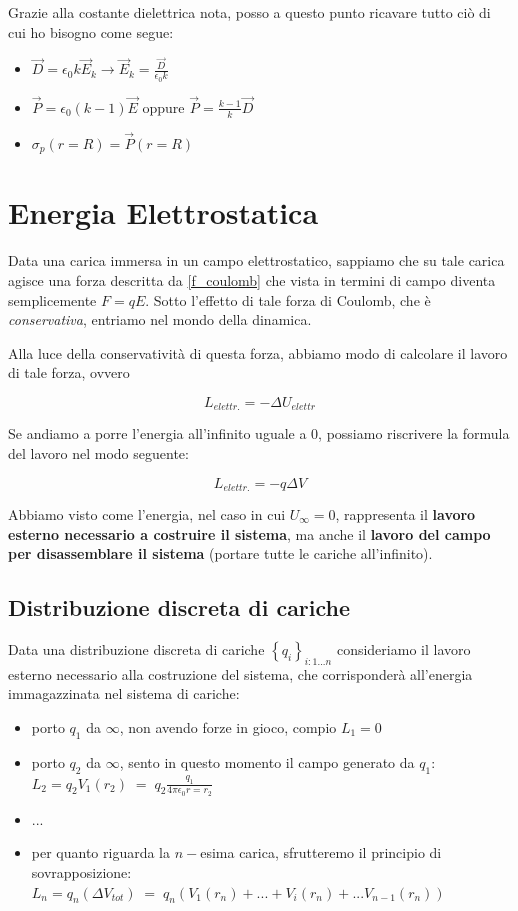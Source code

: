 Grazie alla costante dielettrica nota, posso a questo punto ricavare tutto ciò di cui ho bisogno come segue: 

\begin{itemize}
		\item $ \vec{D} = \epsilon_0 k \vec{E}_k  \longrightarrow \vec{E}_k= \frac{\vec{D}}{\epsilon_0k}$
		\item $\vec{P} = \epsilon_0 (k-1) \vec{E}$ oppure $\vec{P} = \frac{k-1}{k} \vec{D}$
		\item $\sigma_p (r=R) = \vec{P}(r=R)$
\end{itemize}

\section{Energia Elettrostatica}

Data una carica immersa in un campo elettrostatico, sappiamo che su tale carica agisce una forza descritta da \ref{f_coulomb} che vista in termini di campo diventa semplicemente $F = qE$. Sotto l'effetto di tale forza di Coulomb, che è \textit{conservativa}, entriamo nel mondo della dinamica. 

Alla luce della conservatività di questa forza, abbiamo modo di calcolare il lavoro di tale forza, ovvero

$$L_{elettr.} = -\Delta U_{elettr}$$

Se andiamo a porre l'energia all'infinito uguale a 0, possiamo riscrivere la formula del lavoro nel modo seguente: 

$$
L_{elettr.} = -q\Delta V
$$

Abbiamo visto come l'energia, nel caso in cui $U_{\infty} = 0$, rappresenta il \textbf{lavoro esterno necessario a costruire il sistema}, ma anche il \textbf{lavoro del campo per disassemblare il sistema} (portare tutte le cariche all'infinito).

\subsection{Distribuzione discreta di cariche}
Data una distribuzione discreta di cariche $\left\{q_i\right\}_{i:1...n}$ consideriamo il lavoro esterno necessario alla costruzione del sistema, che corrisponderà all'energia immagazzinata nel sistema di cariche: 

\begin{itemize}
	\item  porto $q_1$ da $\infty$, non avendo forze in gioco, compio $L_1 = 0$
	\item  porto $q_2$ da $\infty$, sento in questo momento il campo generato da $q_1$: $L_2 = q_2V_1(r_2) \; = \; q_2\frac{q_1}{4\pi\epsilon_0r=r_2}$
	\item ...
	\item per quanto riguarda la $n-$esima carica, sfrutteremo il principio di sovrapposizione: $L_n = q_n (\Delta V_{tot}) \; = \; q_n(V_1(r_n) + ... + V_i(r_n) + ... V_{n-1}(r_n))$ 
\end{itemize}

